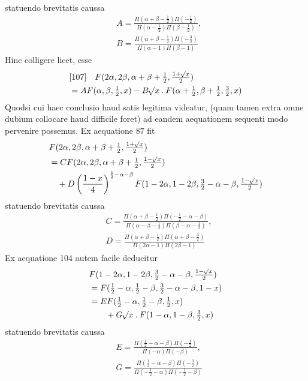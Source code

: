 statuendo brevitatis caussa
\[
\begin{aligned}&A=\frac{\Pi(\alpha+\beta-\tfrac12)\Pi(-\tfrac12)}{\Pi(\alpha-\tfrac12)\Pi(\beta-\tfrac12)},\\&
B=\frac{\Pi(\alpha+\beta-\tfrac12)\Pi(-\tfrac32)}{\Pi(\alpha-1)\Pi(\beta-1)}\end{aligned}
\]
Hinc colligere licet, esse
\[
\begin{aligned}&[107]\quad F(2\alpha,2\beta,\alpha+\beta+\tfrac12,\tfrac{1+\mathord{{}^{}\!\surd}x}2)\\&=AF(\alpha,\beta,\tfrac12,x)-B\mathord{{}^{}\!\surd}x\mathbin{.}F(\alpha+\tfrac12,\beta+\tfrac12,\tfrac32,x)\end{aligned}
\]
Quodsi cui haec conclusio haud satis legitima videatur, (quam tamen extra
omne dubium collocare haud difficile foret) ad eandem aequationem sequenti modo
pervenire possemus. Ex aequatione 87 fit
\[
\begin{aligned}
&F(2\alpha,2\beta,\alpha+\beta+\tfrac12,\tfrac{1+\mathord{{}^{}\!\surd}x}2)\\&=CF(2\alpha,2\beta,\alpha+\beta+\tfrac12,\tfrac{1-\mathord{{}^{}\!\surd}x}2)\\
&\quad+D\left(\frac{1-x}4\right)^{\frac12-\alpha-\beta}F(1-2\alpha,1-2\beta,\tfrac32-\alpha-\beta,\tfrac{1-\mathord{{}^{}\!\surd}x}2)
\end{aligned}
\]
statuendo brevitatis caussa
\[
\begin{aligned}&C=\frac{\Pi(\alpha+\beta-\tfrac12)\Pi(-\tfrac12-\alpha-\beta)}{\Pi(\alpha-\beta-\tfrac12)\Pi(\beta-\alpha-\tfrac12)},\\&
D=\frac{\Pi(\alpha+\beta-\tfrac12)\Pi(\alpha+\beta-\tfrac32)}{\Pi(2\alpha-1)\Pi(2\beta-1)}\end{aligned}
\]
Ex aequatione 104 autem facile deducitur
\[
\begin{aligned}
&F(1-2\alpha,1-2\beta,\tfrac32-\alpha-\beta,\tfrac{1-\mathord{{}^{}\!\surd}x}2)\\&=F(\tfrac12-\alpha,\tfrac12-\beta,\tfrac32-\alpha-\beta,1-x)\\
&=EF(\tfrac12-\alpha,\tfrac12-\beta,\tfrac12,x)\\&\qquad+G\mathord{{}^{}\!\surd}x\mathbin{.}F(1-\alpha,1-\beta,\tfrac32,x)
\end{aligned}
\]
statuendo brevitatis caussa
\[
\begin{aligned}&E=\frac{\Pi(\tfrac12-\alpha-\beta)\Pi(-\tfrac12)}{\Pi(-\alpha)\Pi(-\beta)},\\&
G=\frac{\Pi(\tfrac12-\alpha-\beta)\Pi(-\tfrac32)}{\Pi(-\tfrac12-\alpha)\Pi(-\tfrac12-\beta)}\end{aligned}
\]
